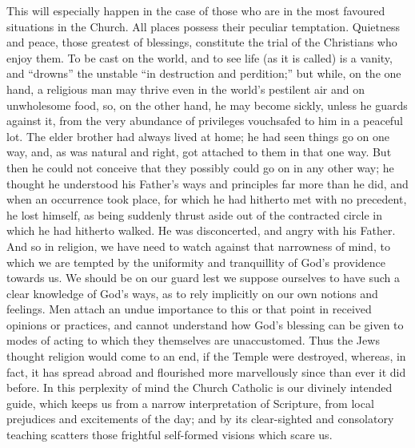 This will especially happen in the case of those who are in the
most favoured situations in the Church. All places possess their
peculiar temptation. Quietness and peace, those greatest of blessings,
constitute the trial of the Christians who enjoy them. To be cast on
the world, and to see life (as it is called) is a vanity, and
``drowns'' the unstable ``in destruction and
perdition;'' but while, on the one hand, a religious man may
thrive even in the world's pestilent air and on unwholesome food, so,
on the other hand, he may become sickly, unless he guards against it,
from the very abundance of privileges vouchsafed to him in a peaceful
lot. The elder brother had always lived at home; he had seen things go
on one way, and, as was natural and right, got attached to them in
that one way. But then he could not conceive that they possibly could
go on in any other way; he thought he understood his Father's ways and
principles far more than he did, and when an occurrence took place,
for which he had hitherto met with no precedent, he lost himself, as
being suddenly thrust aside out of the contracted circle in which he
had hitherto walked. He was disconcerted, and angry with his Father.
And so in religion, we have need to watch against that narrowness of
mind, to which we are tempted by the uniformity and tranquillity of
God's providence towards us. We should be on our guard lest we suppose
ourselves to have such a clear knowledge of God's ways, as to rely
implicitly on our own notions and feelings. Men attach an undue
importance to this or that point in received opinions or practices,
and cannot understand how God's blessing can be given to modes of
acting to which they themselves are unaccustomed. Thus the Jews
thought religion would come to an end, if the Temple were destroyed,
whereas, in fact, it has spread abroad and flourished more
marvellously since than ever it did before. In this perplexity of mind
the Church Catholic is our divinely intended guide, which keeps us
from a narrow interpretation of Scripture, from local prejudices and
excitements of the day; and by its clear-sighted and consolatory
teaching scatters those frightful self-formed visions which scare us.

